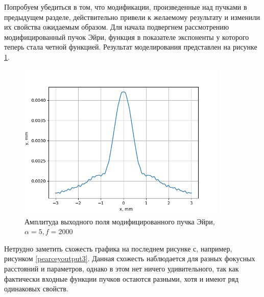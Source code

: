 {	Попробуем убедиться в том, что модификации, произведенные над пучками в предыдущем разделе, действительно привели к желаемому результату и изменили их свойства ожидаемым образом. Для начала подвергнем рассмотрению модифицированный пучок Эйри, функция в показателе экспоненты у которого теперь стала четной функцией. Результат моделирования представлен на рисунке \ref{aieven_output}.
	\begin{figure}[H]
		  \begin{center}
			\includegraphics[width=10cm]{plots/aieven_output}
	\caption{Амплитуда выходного поля модифицированного пучка Эйри, $ \alpha  = 5, f = 2000$}
	\label{aieven_output}
		 \end{center}
\end{figure}
	Нетрудно заметить схожесть графика на последнем рисунке с, например, рисунком \ref{pearceyoutput3}. Данная схожесть наблюдается для разных фокусных расстояний и параметров, однако в этом нет ничего удивительного, так как фактически входные функции пучков остаются разными, хотя и имеют ряд одинаковых свойств.
	
}
